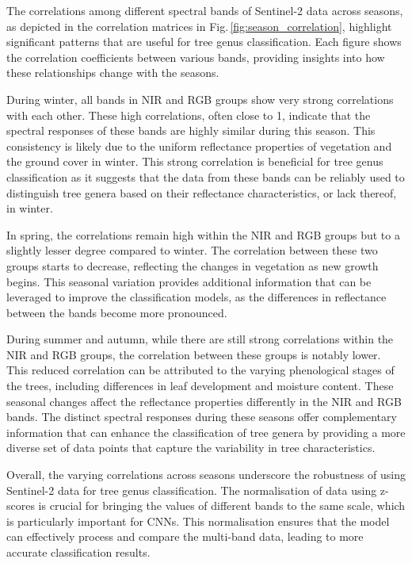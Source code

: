The correlations among different spectral bands of Sentinel-2 data across seasons, as depicted in the correlation matrices in Fig.\,\ref{fig:season_correlation}, highlight significant patterns that are useful for tree genus classification. Each figure shows the correlation coefficients between various bands, providing insights into how these relationships change with the seasons.

During winter, all bands in NIR and RGB groups show very strong correlations with each other. These high correlations, often close to 1, indicate that the spectral responses of these bands are highly similar during this season. This consistency is likely due to the uniform reflectance properties of vegetation and the ground cover in winter. This strong correlation is beneficial for tree genus classification as it suggests that the data from these bands can be reliably used to distinguish tree genera based on their reflectance characteristics, or lack thereof, in winter.

In spring, the correlations remain high within the NIR and RGB groups but to a slightly lesser degree compared to winter. The correlation between these two groups starts to decrease, reflecting the changes in vegetation as new growth begins. This seasonal variation provides additional information that can be leveraged to improve the classification models, as the differences in reflectance between the bands become more pronounced.

During summer and autumn, while there are still strong correlations within the NIR and RGB groups, the correlation between these groups is notably lower. This reduced correlation can be attributed to the varying phenological stages of the trees, including differences in leaf development and moisture content. These seasonal changes affect the reflectance properties differently in the NIR and RGB bands. The distinct spectral responses during these seasons offer complementary information that can enhance the classification of tree genera by providing a more diverse set of data points that capture the variability in tree characteristics.

Overall, the varying correlations across seasons underscore the robustness of using Sentinel-2 data for tree genus classification. The normalisation of data using z-scores is crucial for bringing the values of different bands to the same scale, which is particularly important for CNNs. This normalisation ensures that the model can effectively process and compare the multi-band data, leading to more accurate classification results.

